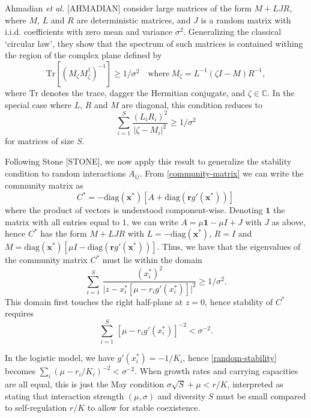 \documentclass[12pt]{article}
\begin{document}
Ahmadian \emph{et al.} [AHMADIAN] consider large matrices of the form $M + LJR$, where $M$,  $L$ and $R$ are deterministic matrices, and $J$ is a random matrix with i.i.d. coefficients with zero mean and variance $\sigma^2$. Generalizing the classical `circular law', they show that the spectrum of such matrices is contained withing the region of the complex plane defined by 
\begin{equation}
    \textrm{Tr}[(M_\zeta M_\zeta^\dagger)^{-1}]\geq 1/\sigma^2 \quad \textrm{where}\ M_\zeta = L^{-1}(\zeta I - M)R^{-1}, 
\end{equation}
where $\textrm{Tr}$ denotes the trace, dagger the Hermitian conjugate, and $\zeta\in\mathbb{C}$. In the special case where $L$, $R$ and $M$ are diagonal, this condition reduces to
\begin{equation}
    \sum_{i=1}^S\frac{(L_{i}R_{i})^2}{ \vert \zeta - M_{i}\vert^2 }\geq 1/\sigma^2
\end{equation}
for matrices of size $S$. 

Following Stone [STONE], we now apply this result to generalize the stability condition to random interactions $A_{ij}$. From \eqref{community-matrix} we can write the community matrix as
\begin{equation}
    C^* = -\textrm{diag}(\mathbf x^*)[A + \textrm{diag}(\mathbf r  g'( \mathbf x^*))]\,
\end{equation}
where the product of vectors is understood component-wise. Denoting $\mathbf{1}$ the matrix with all entries equal to $1$, we can write $A = \mu \mathbf{1} - \mu I + J$ with $J$ as above, hence $C^*$ has the form $M + LJR$ with  
$L = -\textrm{diag}(\mathbf x^*)$, $R = I$ and $M = \textrm{diag}(\mathbf x^*)[\mu I - \textrm{diag}(\mathbf r g'(\mathbf x^*))]$. Thus, we have that the eigenvalues of the community matrix $C^*$ must lie within the domain 
\begin{equation}
    \sum_{i=1}^S\, \frac{(x_i^*)^2}{\vert z -x_i^*[\mu - r_ig'(x_i^*)]\vert ^2}\geq 1/\sigma^2. 
\end{equation} 
This domain first touches the right half-plane at $z = 0$, hence stability of $C^*$ requires   
\begin{equation}\label{random-stability}
    \sum_{i=1}^S\, [\mu - r_ig'(x_i^*)]^{-2}< \sigma^{-2}. 
\end{equation}

In the logistic model, we have $g'(x^*_i) = -1/K_i$, hence \eqref{random-stability} becomes $\sum_i (\mu - r_i/K_i)^{-2} < \sigma^{-2}$. When growth rates and carrying capacities are all equal, this is just the May condition $\sigma\sqrt{S} + \mu < r/K$, interpreted as stating that interaction strength $(\mu, \sigma)$ and diversity $S$ must be small compared to self-regulation $r/K$ to allow for stable coexistence.
\end{document}

